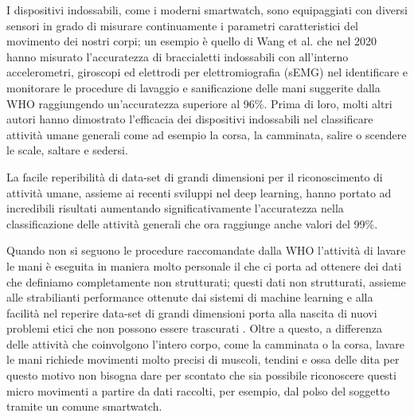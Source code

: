 I dispositivi indossabili, come i moderni smartwatch, sono equipaggiati con diversi sensori in grado di misurare continuamente i parametri caratteristici del movimento dei nostri corpi; un 
esempio è quello di Wang et al.\cite{wang2020accurate} che nel 2020 hanno misurato l'accuratezza di braccialetti indossabili con all'interno accelerometri, giroscopi ed elettrodi per elettromiografia (sEMG) nel 
identificare e monitorare le procedure di lavaggio e sanificazione delle mani suggerite dalla WHO raggiungendo un'accuratezza superiore al 96\%.
Prima di loro, molti altri autori hanno dimostrato l'efficacia dei dispositivi indossabili nel classificare attività umane generali come ad esempio la corsa, la camminata, salire o scendere le 
scale, saltare e sedersi\cite{zhang2013human}\cite{sztyler2016body}\cite{sztyler2017position}\cite{bhat2018online}\cite{koping2018general}\cite{lattanzi2022exploring}.

La facile reperibilità di data-set di grandi dimensioni per il riconoscimento di attività umane, assieme ai recenti sviluppi nel deep learning, hanno portato ad incredibili risultati aumentando 
significativamente l'accuratezza nella classificazione delle attività generali che ora raggiunge anche valori del 99\%\cite{cheng2010active}\cite{singh2017convolutional}\cite{hassan2018robust}\cite{hou2020study}.

Quando non si seguono le procedure raccomandate dalla WHO l'attività di lavare le mani è eseguita in maniera molto personale il che ci porta ad ottenere dei dati che definiamo completamente non strutturati;
questi dati non strutturati, assieme alle strabilianti performance ottenute dai sistemi di machine learning e alla facilità nel reperire data-set di grandi dimensioni porta alla nascita di nuovi problemi
etici che non possono essere trascurati \cite{muller2021ten}. Oltre a questo, a differenza delle attività che coinvolgono l'intero corpo, come la camminata o la corsa, lavare le mani richiede movimenti molto precisi 
di muscoli, tendini e ossa delle dita per questo motivo non bisogna dare per scontato che sia possibile riconoscere questi micro movimenti a partire da dati raccolti, per esempio, dal polso del soggetto 
tramite un comune smartwatch. 

